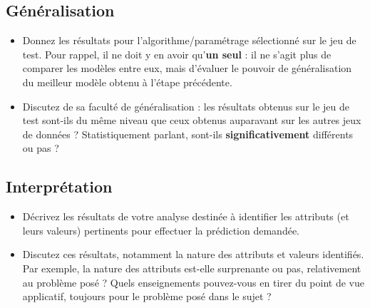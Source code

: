 \documentclass{ceri/sty/rapport}
\begin{document}
\subsection{Généralisation}
\begin{itemize}
	\item Donnez les résultats pour l'algorithme/paramétrage sélectionné sur le jeu de test. Pour rappel, il ne doit y en avoir qu'\textbf{un seul} : il ne s'agit plus de comparer les modèles entre eux, mais d'évaluer le pouvoir de généralisation du meilleur modèle obtenu à l'étape précédente.
	\item Discutez de sa faculté de généralisation : les résultats obtenus sur le jeu de test sont-ils du même niveau que ceux obtenus auparavant sur les autres jeux de données ? Statistiquement parlant, sont-ils \textbf{significativement} différents ou pas ?
\end{itemize}





\subsection{Interprétation}
\begin{itemize}
	\item Décrivez les résultats de votre analyse destinée à identifier les attributs (et leurs valeurs) pertinents pour effectuer la prédiction demandée.
	\item Discutez ces résultats, notamment la nature des attributs et valeurs identifiés. Par exemple, la nature des attributs est-elle surprenante ou pas, relativement au problème posé ? Quels enseignements pouvez-vous en tirer du point de vue applicatif, toujours pour le problème posé dans le sujet ?
\end{itemize}

















\end{document}
